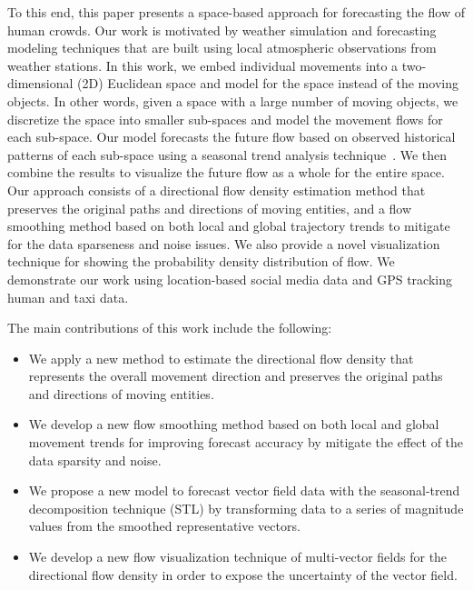 To this end, this paper presents a space-based approach for forecasting the flow of human crowds.
Our work is motivated by weather simulation and forecasting modeling techniques that are built using local atmospheric observations from weather stations. 
In this work, we embed individual movements into a two-dimensional (2D) Euclidean space and model for the space instead of the moving objects.
In other words, given a space with a large number of moving objects, we discretize the space into smaller sub-spaces and model the movement flows for each sub-space.
Our model forecasts the future flow based on observed historical patterns of each sub-space using a seasonal trend analysis technique~\cite{Cleveland:1990:SAS}. 
We then combine the results to visualize the future flow as a whole for the entire space.
Our approach consists of a directional flow density estimation method that preserves the original paths and directions of moving entities, and a flow smoothing method based on both local and global trajectory trends to mitigate for the data sparseness and noise issues.
We also provide a novel visualization technique for showing the probability density distribution of flow.
We demonstrate our work using location-based social media data and GPS tracking human and taxi data.

The main contributions of this work include the following:

\begin{itemize}
	\item We apply a new method to estimate the directional flow density that represents the overall movement direction and preserves the original paths and directions of moving entities.
	\item We develop a new flow smoothing method based on both local and global movement trends for improving forecast accuracy by mitigate the effect of the data sparsity and noise.
	\item We propose a new model to forecast vector field data with the seasonal-trend decomposition technique (STL) by transforming data to a series of magnitude values from the smoothed representative vectors.
	\item We develop a new flow visualization technique of multi-vector fields for the directional flow density in order to expose the uncertainty of the vector field.
\end{itemize}




